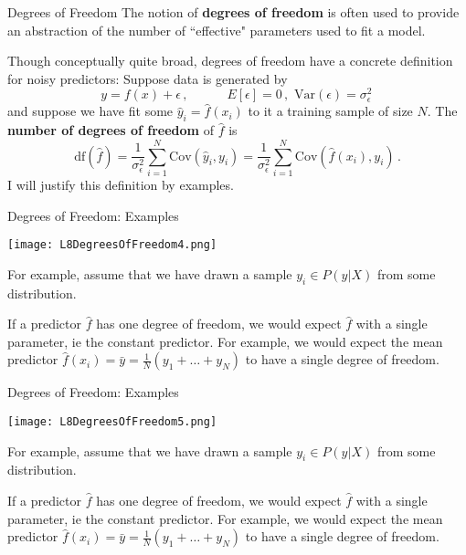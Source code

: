 \documentclass[10pt, table, dvipsnames,xcdraw,handout]{beamer}
\begin{document}
\begin{frame}[fragile]{Degrees of Freedom} 
The notion of \textbf{degrees of freedom} is often used to provide an abstraction of the number of ``effective" parameters used to fit a model.\pause

Though conceptually quite broad, degrees of freedom have a concrete definition for noisy predictors: Suppose data is generated by 
$$
y = f(x)+\epsilon\,,\hspace{3em} E[\epsilon] = 0\,,\,\, \text{Var}(\epsilon) = \sigma^2_\epsilon\,
$$
and suppose we have fit some $\hat y_i = \hat{f}(x_i)$ to it a training sample of size $N$. The \textbf{number of degrees of freedom} of $\hat f$ is 
$$
\text{df}(\hat f) = \frac{1}{\sigma^2_\epsilon} \sum_{i=1}^N  \text{Cov}(\hat y_i, y_i) =  \frac{1}{\sigma^2_\epsilon} \sum_{i=1}^N  \text{Cov}(\hat{f}(x_i), y_i)\,.
$$\pause
I will justify this definition by examples. 
\end{frame}




\begin{frame}[fragile]{Degrees of Freedom: Examples} 
  \begin{minipage}[t][0.5\textheight][t]{\textwidth}
	\centering \texttt{[image: L8DegreesOfFreedom4.png]} 
  \end{minipage}
  \vfill
\begin{minipage}[t][0.5\textheight][t]{\textwidth}
For example, assume that we have drawn a sample $y_i \in P(y|X)$ from some distribution.

If a predictor $\hat{f}$ has one degree of freedom, we would expect $\hat{f}$ with a single parameter, ie the constant predictor. For example, we would expect the mean predictor $\hat{f}(x_i) = \bar y = \frac{1}{N}(y_1+\ldots+y_N)$ to have a single degree of freedom. 
\end{minipage}
\end{frame}





\begin{frame}[fragile]{Degrees of Freedom: Examples} 
  \begin{minipage}[t][0.5\textheight][t]{\textwidth}
	\centering \texttt{[image: L8DegreesOfFreedom5.png]} 
  \end{minipage}
  \vfill
\begin{minipage}[t][0.5\textheight][t]{\textwidth}
For example, assume that we have drawn a sample $y_i \in P(y|X)$ from some distribution.

If a predictor $\hat{f}$ has one degree of freedom, we would expect $\hat{f}$ with a single parameter, ie the constant predictor. For example, we would expect the mean predictor $\hat{f}(x_i) = \bar y = \frac{1}{N}(y_1+\ldots+y_N)$ to have a single degree of freedom. 
\end{minipage}
\end{frame}
\end{document}

